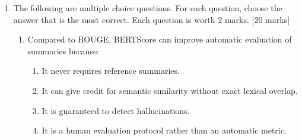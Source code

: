 \documentclass[11pt,a4paper]{article}
\newcommand{\pts}[1]{\hfill [#1 marks]}
\begin{document}
\begin{enumerate}[leftmargin=*]
\begin{enumerate}
\item Explain one advantage and two disadvantages of using RAG rather than relying only on the parametric knowledge of the language model. \pts{4}

\item Alex has to choose between sparse retrieval, dense retrieval, and a hybrid retriever. Compare sparse and dense retrieval in this setting, and explain why a hybrid system with reranking might be useful. \pts{3}

\item For Arabic-speaking users, the first prototype translates the Arabic question into English, retrieves only English documents, generates an English answer, and translates the answer back into Arabic. Describe two problems with the quality of answers this pipeline might produce, and one ethical risk. \pts{3}

\item Alex considers two alternatives: indexing non-English Wikipedia directly, or translating all non-English documents into English before indexing. Give one advantage and one disadvantage of each approach. \pts{3}

\item Describe how you would evaluate this QA system. Your answer should include retrieval evaluation, answer evaluation, and at least one check for contamination or benchmark saturation. \pts{2}
\end{enumerate}

\newpage

\item The following are multiple choice questions. For each question, choose the answer that is the most correct. Each question is worth 2 marks. \pts{20}

\begin{enumerate}
\item Compared to ROUGE, BERTScore can improve automatic evaluation of summaries because:
\begin{enumerate}[label=\Alph*.]
\item It never requires reference summaries.
\item It can give credit for semantic similarity without exact lexical overlap.
\item It is guaranteed to detect hallucinations.
\item It is a human evaluation protocol rather than an automatic metric.
\end{enumerate}


\end{enumerate}
\end{enumerate}
\end{document}
